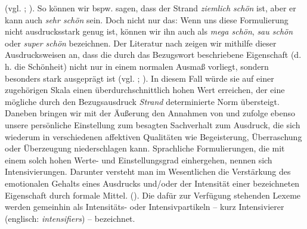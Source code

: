 (vgl. \citealt[74]{Baumgarten.1908}; \citealt[379]{Mendez-Naya.2003}). So können wir bspw. sagen, dass der Strand \textit{ziemlich schön} ist, aber er kann auch \textit{sehr schön} sein. Doch nicht nur das: Wenn uns diese Formulierung nicht ausdrucksstark genug ist, können wir ihn auch als \textit{mega schön}, \textit{sau schön} oder \textit{super schön} bezeichnen. Der Literatur nach zeigen wir mithilfe dieser Ausdrucksweisen an, dass die durch das Bezugswort beschriebene Eigenschaft (d. h. die Schönheit) nicht nur in einem normalen Ausmaß vorliegt, sondern besonders stark ausgeprägt ist (vgl. {\citealt[22]{Paradis.1997}}; {\citealt[133]{Gutzmann.2019a}}). In diesem Fall würde sie auf einer zugehörigen Skala einen überdurchschnittlich hohen Wert erreichen, der eine mögliche durch den Bezugsausdruck \textit{Strand} determinierte Norm übersteigt. Daneben bringen wir mit der Äußerung den Annahmen von {\citet[315]{Lang.1983}} und {\citet[57]{Ortner.2014}} zufolge ebenso unsere persönliche Einstellung zum besagten Sachverhalt zum Ausdruck, die sich wiederum in verschiedenen affektiven Qualitäten wie Begeisterung, Überraschung oder Überzeugung niederschlagen kann. Sprachliche Formulierungen, die mit einem solch hohen Werte- und Einstellungsgrad einhergehen, nennen sich Intensivierungen. Darunter versteht man im Wesentlichen die \glqq{}Verstärkung des emotionalen Gehalts eines Ausdrucks und/oder der Intensität einer bezeichneten Eigenschaft durch formale Mittel.\grqq{} ({\citealt[299]{Glueck.2000}}). Die dafür zur Verfügung stehenden Lexeme werden gemeinhin als Intensitäts- oder Intensivpartikeln -- kurz Intensivierer (englisch: \textit{intensifiers}) -- bezeichnet.



